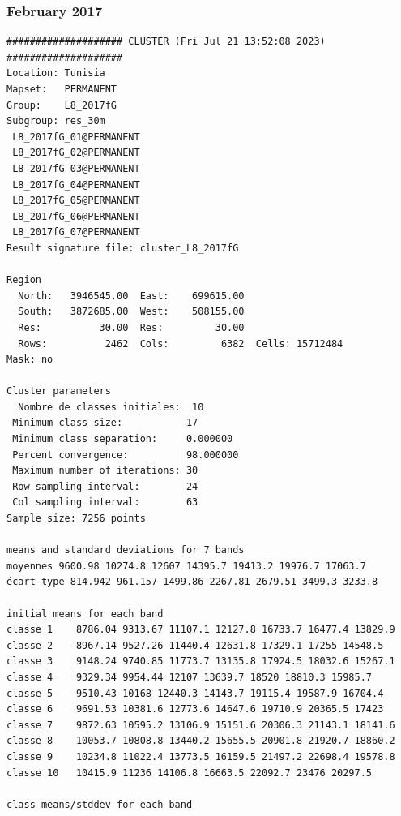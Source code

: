 \documentclass[environments,article,submit,pdftex,moreauthors]{Definitions/mdpi}
\begin{document}
\subsubsection[\appendixname~\thesubsubsection]{February 2017}
\begin{scriptsize}
\begin{verbatim}
#################### CLUSTER (Fri Jul 21 13:52:08 2023) ####################
Location: Tunisia
Mapset:   PERMANENT
Group:    L8_2017fG
Subgroup: res_30m
 L8_2017fG_01@PERMANENT
 L8_2017fG_02@PERMANENT
 L8_2017fG_03@PERMANENT
 L8_2017fG_04@PERMANENT
 L8_2017fG_05@PERMANENT
 L8_2017fG_06@PERMANENT
 L8_2017fG_07@PERMANENT
Result signature file: cluster_L8_2017fG

Region
  North:   3946545.00  East:    699615.00
  South:   3872685.00  West:    508155.00
  Res:          30.00  Res:         30.00
  Rows:          2462  Cols:         6382  Cells: 15712484
Mask: no

Cluster parameters
  Nombre de classes initiales: 	10
 Minimum class size:           17
 Minimum class separation:     0.000000
 Percent convergence:          98.000000
 Maximum number of iterations: 30
 Row sampling interval:        24
 Col sampling interval:        63
Sample size: 7256 points

means and standard deviations for 7 bands
moyennes 9600.98 10274.8 12607 14395.7 19413.2 19976.7 17063.7
écart-type 814.942 961.157 1499.86 2267.81 2679.51 3499.3 3233.8

initial means for each band
classe 1    8786.04 9313.67 11107.1 12127.8 16733.7 16477.4 13829.9
classe 2    8967.14 9527.26 11440.4 12631.8 17329.1 17255 14548.5
classe 3    9148.24 9740.85 11773.7 13135.8 17924.5 18032.6 15267.1
classe 4    9329.34 9954.44 12107 13639.7 18520 18810.3 15985.7
classe 5    9510.43 10168 12440.3 14143.7 19115.4 19587.9 16704.4
classe 6    9691.53 10381.6 12773.6 14647.6 19710.9 20365.5 17423
classe 7    9872.63 10595.2 13106.9 15151.6 20306.3 21143.1 18141.6
classe 8    10053.7 10808.8 13440.2 15655.5 20901.8 21920.7 18860.2
classe 9    10234.8 11022.4 13773.5 16159.5 21497.2 22698.4 19578.8
classe 10   10415.9 11236 14106.8 16663.5 22092.7 23476 20297.5

class means/stddev for each band


\end{verbatim}
\end{scriptsize}
\end{document}
